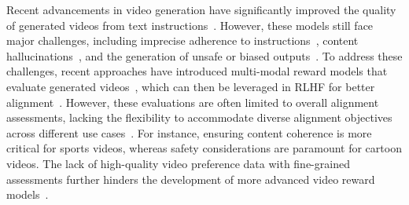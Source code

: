 Recent advancements in video generation have significantly improved the quality of generated videos from text instructions~\cite{Prabhudesai_Mendonca_Qin_Fragkiadaki_Pathak, Yuan_Zhang_Wang_Wei_Feng_Pan_Zhang_Liu_Albanie_Ni_2023, black2024trainingdiffusionmodelsreinforcement}. However, these models still face major challenges, including imprecise adherence to instructions~\cite{hong2022cogvideolargescalepretrainingtexttovideo, li2024surveylongvideogeneration}, content hallucinations~\cite{unterthiner2019accurategenerativemodelsvideo, chu2024soradetectorunifiedhallucination}, and the generation of unsafe or biased outputs~\cite{singer2022makeavideotexttovideogenerationtextvideo, cho2023dallevalprobingreasoningskills}. To address these challenges, recent approaches have introduced multi-modal reward models that evaluate generated videos~\citep{he2024videoscore, xu2021videoclipcontrastivepretrainingzeroshot}, which can then be leveraged in RLHF for better alignment~\citep{wallace2024diffusion, yuan2024instructvideo, huang2024diffusionrewardlearningrewards}. However, these evaluations are often limited to overall alignment assessments, lacking the flexibility to accommodate diverse alignment objectives across different use cases~\citep{yang2021associatingobjectstransformersvideo, Prabhudesai_Mendonca_Qin_Fragkiadaki_Pathak, wang2024mementoscomprehensivebenchmarkmultimodal, shao2020finegymhierarchicalvideodataset}. For instance, ensuring content coherence is more critical for sports videos, whereas safety considerations are paramount for cartoon videos. The lack of high-quality video preference data with fine-grained assessments further hinders the development of more advanced video reward models~\citep{he2024videoscore, dai2024safesorasafetyalignmenttext2video}.


